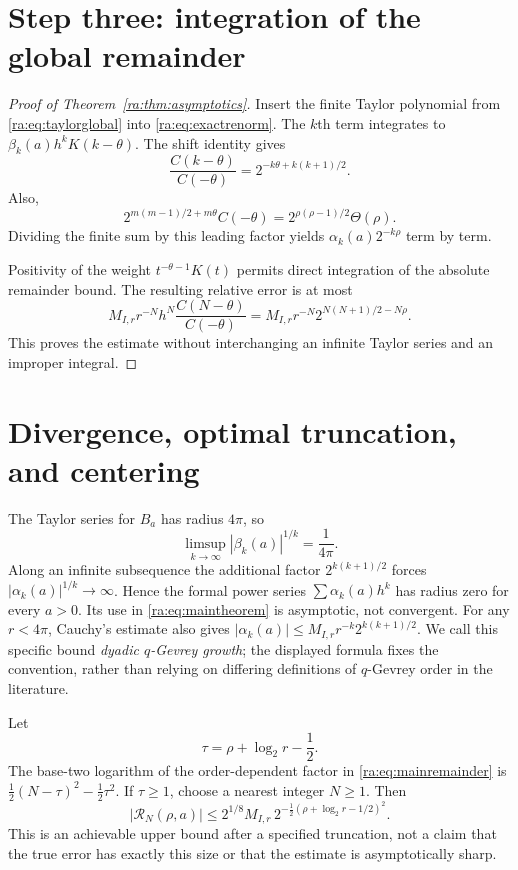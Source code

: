 \documentclass[11pt,a4paper,oneside,openany]{book}
\numberwithin{equation}{chapter}
\theoremstyle{definition}
\theoremstyle{remark}
\newcommand{\W}{K}
\begin{document}
\section{Step three: integration of the global remainder}
\begin{proof}[Proof of Theorem~\ref{ra:thm:asymptotics}]
Insert the finite Taylor polynomial from \eqref{ra:eq:taylorglobal} into
\eqref{ra:eq:exactrenorm}. The $k$th term integrates to
$\beta_k(a)h^kK(k-\theta)$.
The shift identity gives
\begin{equation}\label{ra:eq:momentratio}
 \frac{C(k-\theta)}{C(-\theta)}
   =2^{-k\theta+k(k+1)/2}.
\end{equation}
Also,
\begin{equation}\label{ra:eq:leadingfactor}
 2^{m(m-1)/2+m\theta}C(-\theta)
   =2^{\rho(\rho-1)/2}\Theta(\rho).
\end{equation}
Dividing the finite sum by this leading factor yields
$\alpha_k(a)2^{-k\rho}$ term by term.

Positivity of the weight $t^{-\theta-1}\W(t)$ permits direct integration
of the absolute remainder bound. The resulting relative error is at most
\[
 M_{I,r}r^{-N}h^N\frac{C(N-\theta)}{C(-\theta)}
 =M_{I,r}r^{-N}2^{N(N+1)/2-N\rho}.
\]
This proves the estimate without interchanging an infinite Taylor series
and an improper integral.
\end{proof}

\section{Divergence, optimal truncation, and centering}
The Taylor series for $B_a$ has radius $4\pi$, so
\begin{equation}\label{ra:eq:rlimsup}
 \limsup_{k\to\infty}|\beta_k(a)|^{1/k}=\frac1{4\pi}.
\end{equation}
Along an infinite subsequence the additional factor
$2^{k(k+1)/2}$ forces $|\alpha_k(a)|^{1/k}\to\infty$.
Hence the formal power series $\sum \alpha_k(a)h^k$ has radius zero for every
$a>0$. Its use in \eqref{ra:eq:maintheorem} is asymptotic, not convergent.
For any $r<4\pi$, Cauchy's estimate also gives
$|\alpha_k(a)|\le M_{I,r}r^{-k}2^{k(k+1)/2}$.
We call this specific bound \emph{dyadic $q$-Gevrey growth}; the displayed
formula fixes the convention, rather than relying on differing definitions
of $q$-Gevrey order in the literature.

Let
\begin{equation}\label{ra:eq:tau}
 \tau=\rho+\log_2r-\frac12.
\end{equation}
The base-two logarithm of the order-dependent factor in
\eqref{ra:eq:mainremainder} is
$\frac12(N-\tau)^2-\frac12\tau^2$.
If $\tau\ge1$, choose a nearest integer $N\ge1$. Then
\begin{equation}\label{ra:eq:optimal}
 |\mathcal R_N(\rho,a)|
 \le 2^{1/8}M_{I,r}\,2^{-\frac12(\rho+\log_2r-1/2)^2}.
\end{equation}
This is an achievable upper bound after a specified truncation, not a
claim that the true error has exactly this size or that the estimate is
asymptotically sharp.
\end{document}
